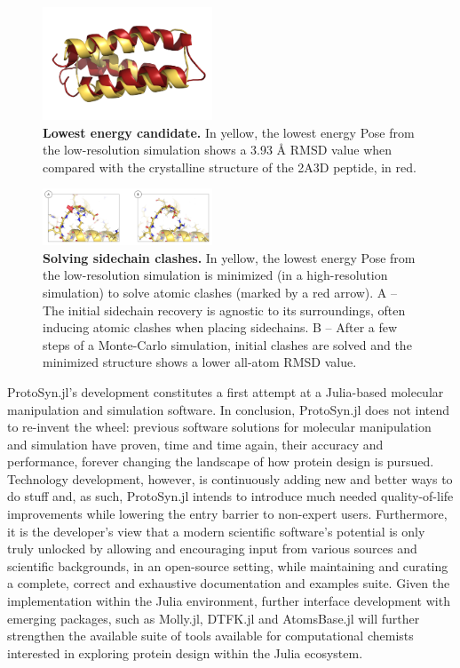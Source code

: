 \documentclass{juliacon}
\begin{document}
\begin{figure}[h]
\centering
\includegraphics[width=0.45\textwidth]{ProtoSynArticle-IM5}
\caption{\textbf{Lowest energy candidate.} In yellow, the lowest energy Pose from the low-resolution simulation shows a 3.93 Å RMSD value when compared with the crystalline structure of the 2A3D peptide, in red.}
\label{fig:ProtoSynArticle-IM5}
\end{figure}

\begin{figure}[h]
\centering
\includegraphics[width=0.45\textwidth]{ProtoSynArticle-IM6}
\caption{\textbf{Solving sidechain clashes.} In yellow, the lowest energy Pose from the low-resolution simulation is minimized (in a high-resolution simulation) to solve atomic clashes (marked by a red arrow). A – The initial sidechain recovery is agnostic to its surroundings, often inducing atomic clashes when placing sidechains. B – After a few steps of a Monte-Carlo simulation, initial clashes are solved and the minimized structure shows a lower all-atom RMSD value.}
\label{fig:ProtoSynArticle-IM6}
\end{figure}

ProtoSyn.jl’s development constitutes a first attempt at a Julia-based molecular manipulation and simulation software. In conclusion, ProtoSyn.jl does not intend to re-invent the wheel: previous software solutions for molecular manipulation and simulation have proven, time and time again, their accuracy and performance, forever changing the landscape of how protein design is pursued. Technology development, however, is continuously adding new and better ways to do stuff and, as such, ProtoSyn.jl intends to introduce much needed quality-of-life improvements while lowering the entry barrier to non-expert users. Furthermore, it is the developer’s view that a modern scientific software’s potential is only truly unlocked by allowing and encouraging input from various sources and scientific backgrounds, in an open-source setting, while maintaining and curating a complete, correct and exhaustive documentation and examples suite. Given the implementation within the Julia environment, further interface development with emerging packages, such as Molly.jl, DTFK.jl and AtomsBase.jl will further strengthen the available suite of tools available for computational chemists interested in exploring protein design within the Julia ecosystem.


\end{document}
